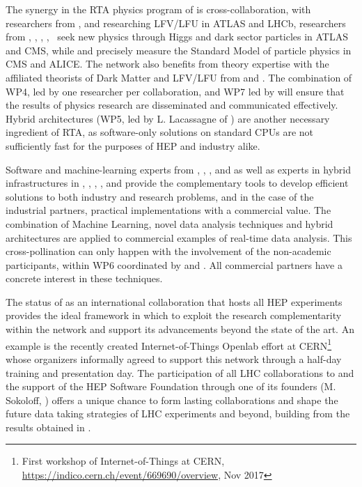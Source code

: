 The synergy in the RTA physics program of \acronym is cross-collaboration,
with researchers from \nikhefentity, \cnrsentity and
\dortmundentity researching LFV/LFU in ATLAS and LHCb,
researchers from \unigeentity, \cernentity, \helsinkientity, \heidelbergentity, \ seek new physics through 
Higgs and dark sector particles in ATLAS and CMS,
while \lundentity and \helsinkientity precisely measure the Standard Model of particle physics in CMS and ALICE. 
The network also benefits from theory expertise with the affiliated theorists of
Dark Matter and LFV/LFU from \ohioentity and \cincinnatientity. 
The combination of WP4, led by one researcher per collaboration, and WP7 led by \cernentity
will ensure that the results of physics research are disseminated and communicated effectively. 
Hybrid architectures (WP5, led by L. Lacassagne of \cnrsentity) are another necessary ingredient of RTA,
as software-only solutions on standard CPUs are not sufficiently fast for the purposes of HEP and industry alike. 

Software and machine-learning experts from \wildtreeentity,
\ximantisentity, \heidelberginstrumentsentity, \dqentity and \ibmentity
as well as  experts in hybrid infrastructures in \pisaentity, \cnrsentity, \fleetmaticsentity,
\lightboxentity, and \cathientity provide the complementary
tools to develop efficient solutions to both industry and research problems, and in the case of the
industrial partners, practical implementations with a commercial value. 
The combination of Machine Learning, novel data analysis techniques and hybrid architectures 
are applied to commercial examples of real-time data analysis. This cross-pollination can only happen with the 
involvement of the non-academic participants, within WP6 coordinated by \heidelbergentity and \dqentity. 
All commercial partners have a concrete interest in these techniques. 

The status of \cernentity as an international collaboration that
hosts all HEP experiments provides the ideal framework in which
to exploit the research complementarity within the network and support its 
advancements beyond the state of the art. An example is the recently created Internet-of-Things
Openlab effort at CERN\footnote{First workshop of Internet-of-Things at CERN, \url{https://indico.cern.ch/event/669690/overview}, Nov 2017}
whose organizers informally agreed to support this network through a half-day 
training and presentation day. 
The participation of all LHC collaborations to \acronym and the support of the HEP Software Foundation
through one of its founders (M. Sokoloff, \cincinnatientity) offers a unique chance to 
form lasting collaborations
and shape the future data taking strategies of LHC experiments and beyond, building from the 
results obtained in \acronym.  


